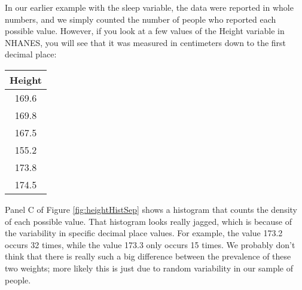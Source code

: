 \documentclass[]{book}
\newenvironment{Shaded}{\begin{snugshade}}{\end{snugshade}}
\newcommand{\KeywordTok}[1]{\textcolor[rgb]{0.13,0.29,0.53}{\textbf{#1}}}
\newcommand{\DecValTok}[1]{\textcolor[rgb]{0.00,0.00,0.81}{#1}}
\newcommand{\StringTok}[1]{\textcolor[rgb]{0.31,0.60,0.02}{#1}}
\newcommand{\CommentTok}[1]{\textcolor[rgb]{0.56,0.35,0.01}{\textit{#1}}}
\newcommand{\OperatorTok}[1]{\textcolor[rgb]{0.81,0.36,0.00}{\textbf{#1}}}
\newcommand{\NormalTok}[1]{#1}
\theoremstyle{definition}
\theoremstyle{definition}
\theoremstyle{definition}
\theoremstyle{remark}
\begin{document}
In our earlier example with the sleep variable, the data were reported
in whole numbers, and we simply counted the number of people who
reported each possible value. However, if you look at a few values of
the Height variable in NHANES, you will see that it was measured in
centimeters down to the first decimal place:

\begin{Shaded}
\end{Shaded}

\begin{longtable}[]{@{}c@{}}
\toprule
\begin{minipage}[b]{0.11\columnwidth}\centering\strut
Height\strut
\end{minipage}\tabularnewline
\midrule
\endhead
\begin{minipage}[t]{0.11\columnwidth}\centering\strut
169.6\strut
\end{minipage}\tabularnewline
\begin{minipage}[t]{0.11\columnwidth}\centering\strut
169.8\strut
\end{minipage}\tabularnewline
\begin{minipage}[t]{0.11\columnwidth}\centering\strut
167.5\strut
\end{minipage}\tabularnewline
\begin{minipage}[t]{0.11\columnwidth}\centering\strut
155.2\strut
\end{minipage}\tabularnewline
\begin{minipage}[t]{0.11\columnwidth}\centering\strut
173.8\strut
\end{minipage}\tabularnewline
\begin{minipage}[t]{0.11\columnwidth}\centering\strut
174.5\strut
\end{minipage}\tabularnewline
\bottomrule
\end{longtable}

Panel C of Figure \ref{fig:heightHistSep} shows a histogram that counts
the density of each possible value. That histogram looks really jagged,
which is because of the variability in specific decimal place values.
For example, the value 173.2 occurs 32 times, while the value 173.3 only
occurs 15 times. We probably don't think that there is really such a big
difference between the prevalence of these two weights; more likely this
is just due to random variability in our sample of people.
\end{document}
